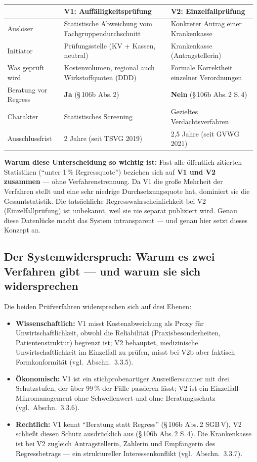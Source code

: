 \documentclass{umbruch-position}
\begin{document}
{\small
\begin{tabularx}{\textwidth}{l X X}
\toprule
 & \textbf{V1: Auffälligkeitsprüfung} & \textbf{V2: Einzelfallprüfung} \\
\midrule
Auslöser & Statistische Abweichung vom Fachgruppendurchschnitt & Konkreter Antrag einer Krankenkasse \\
\addlinespace
Initiator & Prüfungsstelle (KV + Kassen, neutral) & Krankenkasse (Antragstellerin) \\
\addlinespace
Was geprüft wird & Kostenvolumen, regional auch Wirkstoffquoten (DDD) & Formale Korrektheit einzelner Verordnungen \\
\addlinespace
Beratung vor Regress & \textbf{Ja} (\S\,106b Abs.\,2) & \textbf{Nein} (\S\,106b Abs.\,2 S.\,4) \\
\addlinespace
Charakter & Statistisches Screening & Gezieltes Verdachtsverfahren \\
\addlinespace
Ausschlussfrist & 2 Jahre (seit TSVG 2019) & 2,5 Jahre (seit GVWG 2021) \\
\bottomrule
\end{tabularx}
}

\textbf{Warum diese Unterscheidung so wichtig ist:} Fast alle öffentlich zitierten Statistiken (``unter 1\,\% Regressquote'') beziehen sich auf \textbf{V1 und V2 zusammen} --- ohne Verfahrenstrennung. Da V1 die große Mehrheit der Verfahren stellt und eine sehr niedrige Durchsetzungsquote hat, dominiert sie die Gesamtstatistik. Die tatsächliche Regresswahrscheinlichkeit bei V2 (Einzelfallprüfung) ist unbekannt, weil sie nie separat publiziert wird. Genau diese Datenlücke macht das System intransparent --- und genau hier setzt dieses Konzept an.

\subsection{Der Systemwiderspruch: Warum es zwei Verfahren gibt --- und warum sie sich widersprechen}

Die beiden Pr\"ufverfahren widersprechen sich auf drei Ebenen:

\begin{itemize}[nosep]
  \item \textbf{Wissenschaftlich:} V1 misst Kostenabweichung als Proxy f\"ur Unwirtschaftlichkeit, obwohl die Reliabilit\"at (Praxisbesonderheiten, Patientenstruktur) begrenzt ist; V2 behauptet, medizinische Unwirtschaftlichkeit im Einzelfall zu pr\"ufen, misst bei V2b aber faktisch Formkonformit\"at (vgl.\ Abschn.~3.3.5).
  \item \textbf{\"Okonomisch:} V1 ist ein stichprobenartiger Ausrei\ss{}erscanner mit drei Schutzstufen, der \"uber 99\,\% der F\"alle passieren l\"asst; V2 ist ein Einzelfall-Mikromanagement ohne Schwellenwert und ohne Beratungsschutz (vgl.\ Abschn.~3.3.6).
  \item \textbf{Rechtlich:} V1 kennt ``Beratung statt Regress'' (\S\,106b Abs.\,2 SGB\,V), V2 schlie\ss{}t diesen Schutz ausdr\"ucklich aus (\S\,106b Abs.\,2 S.\,4). Die Krankenkasse ist bei V2 zugleich Antragstellerin, Zahlerin und Empf\"angerin des Regressbetrags --- ein struktureller Interessenkonflikt (vgl.\ Abschn.~3.3.7).
\end{itemize}
\end{document}
